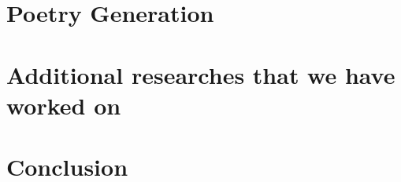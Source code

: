 \section{Poetry Generation}


\section{Additional researches that we have worked on}




%

\section{Conclusion}



